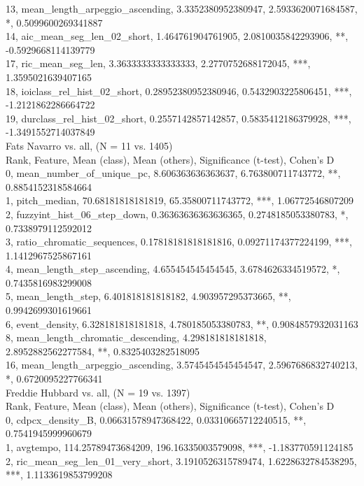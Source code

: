 13, mean_length_arpeggio_ascending, 3.3352380952380947, 2.5933620071684587, *, 0.5099600269341887\\
14, aic_mean_seg_len_02_short, 1.464761904761905, 2.0810035842293906, **, -0.5929668114139779\\
17, ric_mean_seg_len, 3.3633333333333333, 2.2770752688172045, ***, 1.3595021639407165\\
18, ioiclass_rel_hist_02_short, 0.28952380952380946, 0.5432903225806451, ***, -1.2121862286664722\\
19, durclass_rel_hist_02_short, 0.2557142857142857, 0.5835412186379928, ***, -1.3491552714037849\\
Fats Navarro vs. all, (N = 11 vs. 1405)\\
Rank, Feature, Mean (class), Mean (others), Significance (t-test), Cohen's D\\
0, mean_number_of_unique_pc, 8.606363636363637, 6.763800711743772, **, 0.8854152318584664\\
1, pitch_median, 70.68181818181819, 65.35800711743772, ***, 1.06772546807209\\
2, fuzzyint_hist_06_step_down, 0.36363636363636365, 0.2748185053380783, *, 0.7338979112592012\\
3, ratio_chromatic_sequences, 0.17818181818181816, 0.09271174377224199, ***, 1.1412967525867161\\
4, mean_length_step_ascending, 4.655454545454545, 3.6784626334519572, *, 0.7435816983299008\\
5, mean_length_step, 6.401818181818182, 4.903957295373665, **, 0.9942699301619661\\
6, event_density, 6.328181818181818, 4.780185053380783, **, 0.9084857932031163\\
8, mean_length_chromatic_descending, 4.298181818181818, 2.8952882562277584, **, 0.8325403282518095\\
16, mean_length_arpeggio_ascending, 3.5745454545454547, 2.5967686832740213, *, 0.6720095227766341\\
Freddie Hubbard vs. all, (N = 19 vs. 1397)\\
Rank, Feature, Mean (class), Mean (others), Significance (t-test), Cohen's D\\
0, cdpcx_density_B, 0.06631578947368422, 0.03310665712240515, **, 0.7541945999960679\\
1, avgtempo, 114.25789473684209, 196.16335003579098, ***, -1.183770591124185\\
2, ric_mean_seg_len_01_very_short, 3.1910526315789474, 1.6228632784538295, ***, 1.1133619853799208\\
